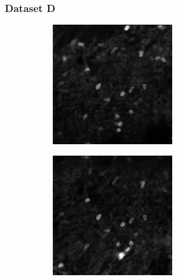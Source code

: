 	\subsubsection{Dataset D}
	\begin{figure}[h]
		\begin{subfigure}{.32\textwidth}
		\includegraphics[width=\textwidth]{images/series14croppedclean024}
		\end{subfigure}%
		\hfill
		\begin{subfigure}{.32\textwidth}
		\includegraphics[width=\textwidth]{images/series14croppedclean025}

\end{subfigure}
\end{figure}
